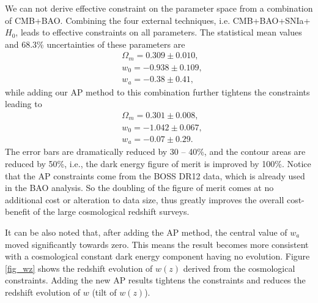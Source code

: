 \documentclass[iop]{emulateapj}
\begin{document}

We can not derive effective constraint on the parameter space from a combination of CMB+BAO.
Combining the four external techniques, i.e. CMB+BAO+SNIa+$H_0$, leads to effective constraints on all parameters.
The statistical mean values and 68.3\% uncertainties of these parameters are
\begin{eqnarray}
&\Omega_m = 0.309 \pm 0.010,\\
&w_0 = -0.938 \pm 0.109,\\
&w_a = -0.38 \pm 0.41,
\end{eqnarray}
while adding our AP method to this combination further tightens the constraints leading to
\begin{eqnarray}
&\Omega_m = 0.301 \pm 0.008,\\
&w_0 = -1.042 \pm 0.067,\\
&w_a = -0.07 \pm 0.29.
\end{eqnarray}
The error bars are dramatically reduced by 30 -- 40\%,
and the contour areas are reduced by 50\%, i.e., the dark energy figure of merit is improved by 100\%. 
Notice that the AP constraints come from the BOSS DR12 data, which is already used in the BAO analysis.
So the doubling of the figure of merit comes at no additional cost or alteration to data size,
thus greatly improves the overall cost-benefit of the large cosmological redshift surveys.


It can be also noted that, after adding the AP method, the central value of $w_a$ moved significantly towards zero.
This means the result becomes more consistent with a cosmological constant dark energy component having no evolution.
Figure \ref{fig_wz} shows the redshift evolution of $w(z)$ derived from the cosmological constraints.
Adding the new AP results tightens the constraints and reduces the redshift evolution of $w$ (tilt of $w(z)$).
\end{document}
